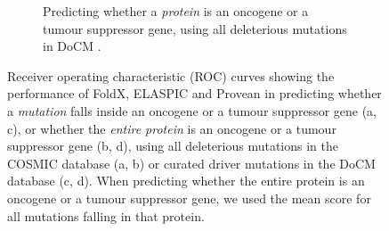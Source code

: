 \begin{figure}[tb]
\begin{subfigure}[t]{0.48\textwidth}
		\caption{
			Predicting whether a \textit{protein} is an oncogene or a tumour suppressor gene, using all deleterious mutations in DoCM \cite{griffith_civic:_2016}.
		}
		\label{fig:validation_cancer_bygene_high_confidence}
		\vspace*{5mm}
	\end{subfigure}%
	\caption[Predicting whether a mutation falls in an oncogene or a tumour suppressor gene.]{
			Receiver operating characteristic (ROC) curves showing the performance of FoldX, ELASPIC and Provean in predicting whether a \textit{mutation} falls inside an oncogene or a tumour suppressor gene (a, c), or whether the \textit{entire protein} is an oncogene or a tumour suppressor gene (b, d), using all deleterious mutations in the COSMIC database (a, b) or curated driver mutations in the DoCM database \cite{griffith_civic:_2016} (c, d).
			When predicting whether the entire protein is an oncogene or a tumour suppressor gene, we used the mean score for all mutations falling in that protein.
		}
	\label{fig:validation_cancer}
\end{figure}
